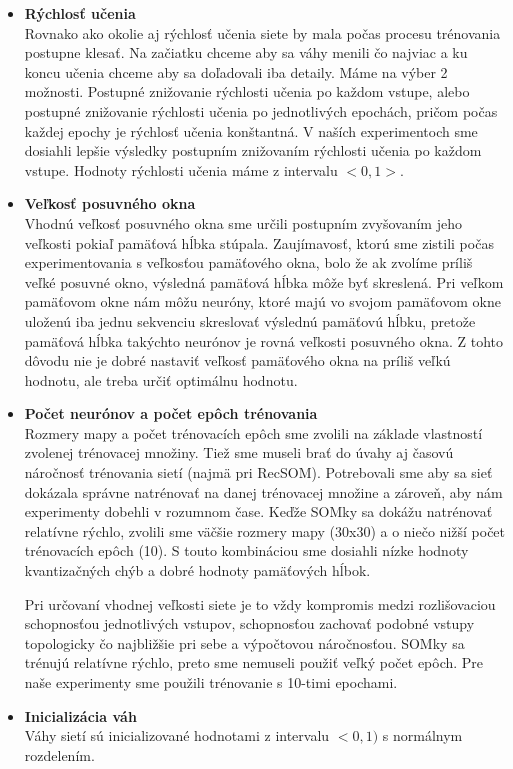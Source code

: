 \begin{itemize}
    \item \textbf{Rýchlosť učenia} \\
    Rovnako ako okolie aj rýchlosť učenia siete by mala počas
procesu trénovania postupne klesať. Na začiatku chceme aby sa váhy menili čo najviac
a ku koncu učenia chceme aby sa doľadovali iba detaily.
Máme na výber 2 možnosti. Postupné znižovanie rýchlosti učenia po každom vstupe, alebo 
postupné znižovanie rýchlosti učenia po jednotlivých epochách, pričom počas každej epochy
je rýchlosť učenia konštantná. 
V naších experimentoch sme dosiahli lepšie výsledky postupním 
znižovaním rýchlosti učenia po každom vstupe. 
Hodnoty rýchlosti učenia máme z intervalu $<0, 1>$.
    \item \textbf{Veľkosť posuvného okna} \\
    Vhodnú veľkosť posuvného okna sme určili postupním zvyšovaním jeho veľkosti pokiaľ pamäťová hĺbka stúpala. 
Zaujímavosť, ktorú sme zistili počas experimentovania s veľkosťou pamäťového okna, bolo že 
ak zvolíme príliš veľké posuvné okno, výsledná pamäťová hĺbka môže byť skreslená.
Pri veľkom pamäťovom okne nám môžu neuróny, ktoré majú vo svojom pamäťovom okne uloženú iba 
jednu sekvenciu skreslovať výslednú pamäťovú hĺbku, pretože pamäťová hĺbka takýchto
neurónov je rovná veľkosti posuvného okna. Z tohto dôvodu nie je dobré nastaviť veľkosť pamäťového okna na 
príliš veľkú hodnotu, ale treba určiť optimálnu hodnotu.
    \item \textbf{Počet neurónov a počet epôch trénovania} \\
    Rozmery mapy a počet trénovacích epôch sme zvolili na základe vlastností zvolenej trénovacej množiny. 
Tiež sme museli brať do úvahy aj časovú náročnosť trénovania sietí (najmä pri RecSOM).
Potrebovali sme aby sa sieť dokázala správne natrénovať na danej trénovacej množine a zároveň, aby nám experimenty dobehli v rozumnom čase.
Keďže SOMky sa dokážu natrénovať relatívne rýchlo, zvolili sme väčšie rozmery mapy (30x30) a o niečo nižší počet trénovacích epôch (10).
S touto kombináciou sme dosiahli nízke hodnoty kvantizačných chýb a dobré hodnoty pamäťových hĺbok.

Pri určovaní vhodnej veľkosti siete je to vždy kompromis medzi rozlišovaciou schopnosťou jednotlivých vstupov, schopnosťou
zachovať podobné vstupy topologicky čo najbližšie pri sebe a výpočtovou náročnosťou. 
SOMky sa trénujú relatívne rýchlo, preto sme nemuseli použiť veľký počet epôch. Pre naše experimenty sme 
použili trénovanie s 10-timi epochami.
    \item \textbf{Inicializácia váh} \\ 
Váhy sietí sú inicializované hodnotami z intervalu $<0, 1)$ s normálnym rozdelením.
\end{itemize}


